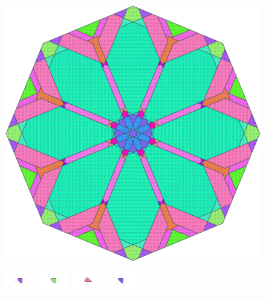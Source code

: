\documentclass[text.tex]{subfiles}
\begin{document}
\clearpage
\pagestyle{fancy}
\fancyhf{}
\begin{figure}[h!]
\centering
\includegraphics[width=1\textwidth]{img/results/octagon/octagon_235355_(7_1alpha_4).pdf}
\includegraphics[width=0.12\textwidth]{img/results/octagon/octagon_235355_(7_1alpha_4)_001.pdf}
\includegraphics[width=0.12\textwidth]{img/results/octagon/octagon_235355_(7_1alpha_4)_002.pdf}
\includegraphics[width=0.12\textwidth]{img/results/octagon/octagon_235355_(7_1alpha_4)_003.pdf}
\includegraphics[width=0.12\textwidth]{img/results/octagon/octagon_235355_(7_1alpha_4)_004.pdf}

\end{figure}
\end{document}
